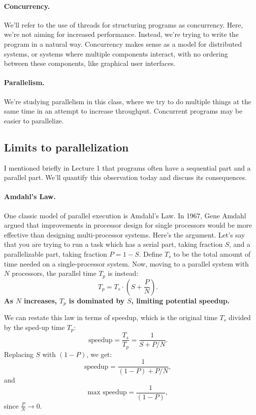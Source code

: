 \paragraph{Concurrency.} We'll refer to the use of threads for
structuring programs as concurrency. Here, we're not aiming
for increased performance. Instead, we're trying to write the program
in a natural way. Concurrency makes sense as a model for distributed
systems, or systems where multiple components interact, with no ordering
between these components, like graphical user interfaces.

\paragraph{Parallelism.} We're studying parallelism in this class, where
we try to do multiple things at the same time in an attempt to increase
throughput. Concurrent programs may be easier to parallelize.

\subsection*{Limits to parallelization}
I mentioned briefly in Lecture 1 that programs often have a sequential
part and a parallel part. We'll quantify this observation today
and discuss its consequences.


\paragraph{Amdahl's Law.} One classic model of parallel execution
is Amdahl's Law. In 1967, Gene Amdahl argued that improvements in
processor design for single processors would be more effective than
designing multi-processor systems. Here's the argument. Let's say that
you are trying to run a task which has a serial part, taking fraction 
$S$, and a parallelizable part, taking fraction $P = 1-S$. Define $T_s$
to be the total 
amount of time needed on a single-processor system.
Now, moving to a parallel system with $N$ processors, the parallel
time $T_p$ is instead:
\[ T_p = T_s \cdot (S + \frac{P}{N}). \]
{\bf As $N$ increases, $T_p$ is dominated by $S$, limiting potential
speedup.}

We can restate this law in terms of speedup, which is the 
original time $T_s$ divided by the sped-up time $T_p$:
\[ \mbox{speedup} = \frac{T_s}{T_p} = \frac{1}{S+P/N}. \]
Replacing $S$ with $(1-P)$, we get:
\[ \mbox{speedup} = \frac{1}{(1-P)+P/N}, \]
and
\[ \mbox{max speedup} = \frac{1}{(1-P)}, \]
since $\frac{P}{N} \rightarrow 0$.

